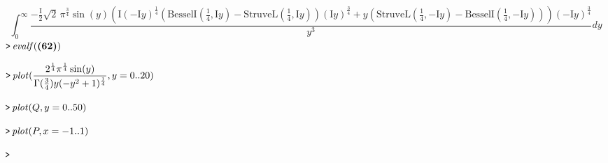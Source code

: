 \documentclass{article}
\begin{document}
\begin{dmath}\label{(62)}
\int_{0}^{\infty}\frac{-\frac{\mathrm{I}}{2} \sqrt{2}\, \pi^{\frac{3}{4}} \sin \! \left(y \right) \left(\mathrm{I} \left(\mathrm{-I} y \right)^{\frac{1}{4}} \left(\mathrm{BesselI}\! \left(\frac{1}{4},\mathrm{I} y \right)-\mathrm{StruveL}\! \left(\frac{1}{4},\mathrm{I} y \right)\right) \left(\mathrm{I} y \right)^{\frac{3}{4}}+y \left(\mathrm{StruveL}\! \left(\frac{1}{4},\mathrm{-I} y \right)-\mathrm{BesselI}\! \left(\frac{1}{4},\mathrm{-I} y \right)\right)\right) \left(\mathrm{-I} y \right)^{\frac{3}{4}}}{y^{3}}d y 
\end{dmath}
\mapleinput
{$ \displaystyle \texttt{>\,} \mathit{evalf} (\mapleref{(62)}) $}

\mapleinput
{$ \displaystyle \texttt{>\,} \mathit{plot} (\frac{2^{\frac{1}{4}} \pi^{\frac{1}{4}} \sin (y)}{\Gamma (\frac{3}{4}) y (-y^{2}+1)^{\frac{1}{4}}},y =0..20) $}


\mapleinput
{$ \displaystyle \texttt{>\,} \mathit{plot} (Q ,y =0..50) $}


\mapleinput
{$ \displaystyle \texttt{>\,} \mathit{plot} (P ,x =-1..1) $}


\mapleinput
{$ \displaystyle \texttt{>\,}  $}
\end{document}
